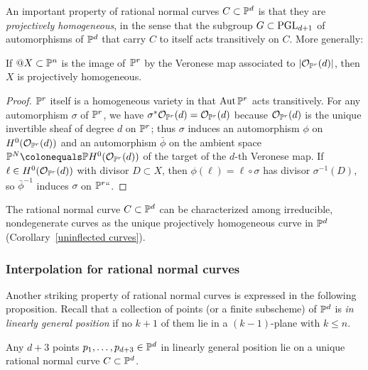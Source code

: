 An
important property of rational normal curves $C \subset {\mathbb P}^d$
is that they are \emph{projectively homogeneous},
in the sense that the
subgroup $G\subset\operatorname{PGL}_{d+1}$ of automorphisms of ${\mathbb P}^d$ that carry
$C$ to itself acts transitively on $C$. More generally:
%

\begin{proposition}\label{Veronese is projectively homogeneous}
If $@X\subset {\mathbb P}^n$ is the image of $\kern1pt{\mathbb P}^r$ by the Veronese map
%
%
associated
to $|{\mathcal O}_{{\mathbb P}^r}(d)|$, then $X$ is projectively homogeneous.
\unif
\end{proposition}

\begin{proof}
${\mathbb P}^r$
itself
is a homogeneous variety
in that $\operatorname{Aut} {\mathbb P}^r$ acts transitively.
For any
automorphism
$\sigma$ of ${\mathbb P}^r$, we have
$\sigma^*{\mathcal O}_{{\mathbb P}^r}(d) = {\mathcal O}_{{\mathbb P}^r}(d)$
because ${\mathcal O}_{{\mathbb P}^r}(d)$ is the unique
invertible sheaf of degree $d$ on ${\mathbb P}^r$;
thus
$\sigma$ induces an automorphism $\phi$ on $H^0({\mathcal O}_{{\mathbb P}^r}(d))$
and an automorphism $\bar \phi$ on the ambient space
$\PP^{N} \colonequals \PP H^0(\cO_{\PP^r}(d))$ of the target of the $d$-th Veronese map. If $\ell \in H^0({\mathcal O}_{{\mathbb P}^r}(d))$
 with divisor $D\subset X$, then $\phi(\ell) = \ell \circ \sigma$ has divisor $\sigma^{-1}(D)$, so $\bar\phi^{-1}$ induces $\sigma$ on ${\mathbb P}^r` `$.
\unif
\end{proof}

The
rational normal curve
%
$C \subset {\mathbb P}^d$ can  be characterized among irreducible,
nondegenerate curves as the unique projectively homogeneous curve in
${\mathbb P}^d$ (Corollary~\ref{uninflected curves}).

\subsubsection*{%
Interpolation
for rational normal curves}
%

Another
striking
property of rational normal curves is expressed in
the following
proposition.
Recall that a collection of points (or a finite subscheme)
of ${\mathbb P}^d$ is
\emph{in linearly general position}
if no $k{+}1$ of them lie in a $(k{-}1)$-plane with $k\leq n$.

\begin{proposition}\label{points on rnc}
%
Any $d+3$ points $p_1,\dots, p_{d+3} \in {\mathbb P}^d$
in linearly general position
lie on a unique rational normal curve $C \subset {\mathbb P}^d$.
\unif
 \end{proposition}

